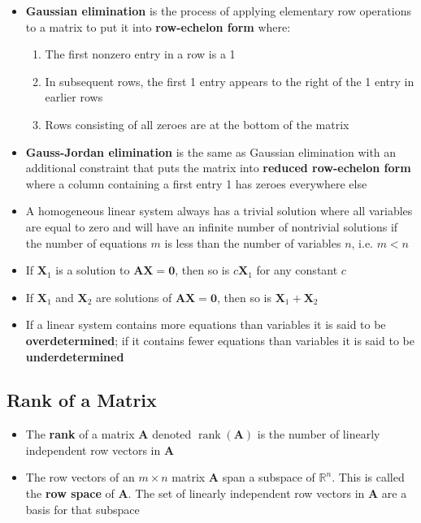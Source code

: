 \documentclass{article}
\newcommand{\rank}{\operatorname{rank}}
\begin{document}
\begin{itemize}
  \item \textbf{Gaussian elimination} is the process of applying elementary row operations to a matrix to put it into \textbf{row-echelon form} where:

        \begin{enumerate}
          \item The first nonzero entry in a row is a 1

          \item In subsequent rows, the first 1 entry appears to the right of the 1 entry in earlier rows

          \item Rows consisting of all zeroes are at the bottom of the matrix
        \end{enumerate}

  \item \textbf{Gauss-Jordan elimination} is the same as Gaussian elimination with an additional constraint that puts the matrix into \textbf{reduced row-echelon form} where a column containing a first entry 1 has zeroes everywhere else

  \item A homogeneous linear system always has a trivial solution where all variables are equal to zero and will have an infinite number of nontrivial solutions if the number of equations $m$ is less than the number of variables $n$, i.e. $m < n$

  \item If $\mathbf{X}_1$ is a solution to $\mathbf{A} \mathbf{X} = \mathbf{0}$, then so is $c \mathbf{X}_1$ for any constant $c$

  \item If $\mathbf{X}_1$ and $\mathbf{X}_2$ are solutions of $\mathbf{A} \mathbf{X} = \mathbf{0}$, then so is $\mathbf{X}_1 + \mathbf{X}_2$

  \item If a linear system contains more equations than variables it is said to be \textbf{overdetermined}; if it contains fewer equations than variables it is said to be \textbf{underdetermined}
\end{itemize}

\subsection{Rank of a Matrix}

\begin{itemize}
  \item The \textbf{rank} of a matrix $\mathbf{A}$ denoted $\rank(\mathbf{A})$ is the number of linearly independent row vectors in $\mathbf{A}$

  \item The row vectors of an $m \times n$ matrix $\mathbf{A}$ span a subspace of $\mathbb{R}^n$. This is called the \textbf{row space} of $\mathbf{A}$. The set of linearly independent row vectors in $\mathbf{A}$ are a basis for that subspace
\end{itemize}
\end{document}

